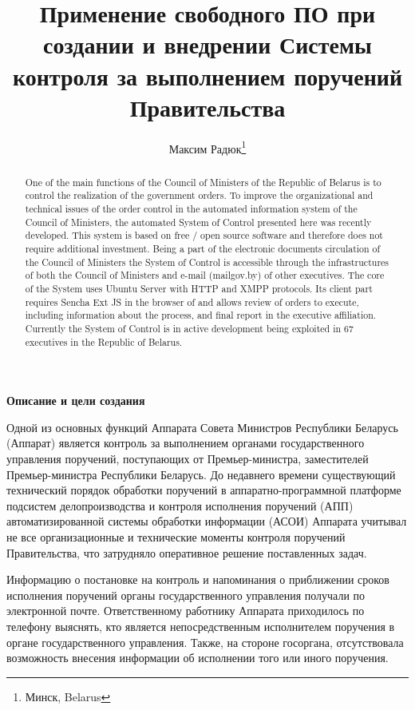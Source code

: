 \documentclass[10pt, a5paper]{article}
\begin{document}
\title{Применение свободного ПО при создании и внедрении Системы контроля за выполнением поручений Правительства}%

\author{Максим Радюк\footnote{Минск, Belarus}}
\maketitle

\begin{abstract}
One of the main functions of the Council of Ministers of the Republic of Belarus is to control the realization of the government orders. To improve the organizational and technical issues of the order control in the automated information system of the Council of Ministers, the automated System of Control presented here was recently developed.
This system is based on free / open source software and therefore does not require additional investment. Being a part of the electronic documents circulation of the Council of Ministers the System of Control is accessible through the infrastructures of both the Council of Ministers and e-mail (mailgov.by) of other executives. The core of the System uses Ubuntu Server with HTTP and XMPP protocols. Its client part requires Sencha Ext JS in the browser of and allows review of orders to execute, including information about the process, and final report in the executive affiliation.
Currently the System of Control is in active development being exploited in 67 executives in the Republic of Belarus.
\end{abstract}

\textbf{Описание и цели создания}

Одной из основных функций Аппарата Совета Министров Республики Беларусь (Аппарат) является контроль за выполнением органами государственного управления поручений, поступающих от Премьер-министра, заместителей Премьер-министра Республики Беларусь.  До недавнего времени существующий технический порядок обработки поручений в аппаратно-программной платформе подсистем делопроизводства и контроля исполнения поручений (АПП) автоматизированной системы обработки информации (АСОИ) Аппарата учитывал не все организационные и технические моменты контроля поручений Правительства, что затрудняло оперативное решение поставленных задач.

Информацию о постановке на контроль и напоминания о приближении сроков исполнения поручений органы государственного управления получали по электронной почте. Ответственному работнику Аппарата приходилось по телефону выяснять, кто является непосредственным исполнителем поручения в органе государственного управления. Также, на стороне госоргана, отсутствовала возможность внесения информации об исполнении того или иного поручения.
\end{document}
